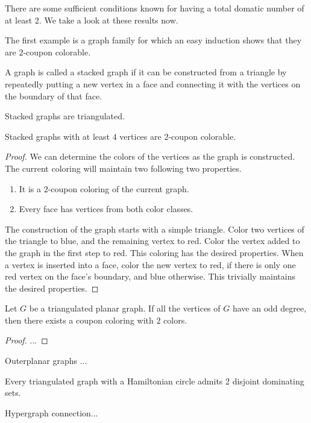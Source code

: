 There are some sufficient conditions known for having a total domatic number of
at least $2$. We take a look at these results now.

The first example is a graph family for which an easy induction shows that they
are $2$-coupon colorable.

\begin{definition}
  A graph is called a stacked graph if it can be constructed from a triangle by
  repeatedly putting a new vertex in a face and connecting it with the vertices on
  the boundary of that face.
\end{definition}
\begin{remark}
  Stacked graphs are triangulated.
\end{remark}
\begin{claim}
  Stacked graphs with at least $4$ vertices are $2$-coupon colorable.
\end{claim}
\begin{proof}
  We can determine the colors of the vertices as the graph is constructed. The
  current coloring will maintain two following two properties.
  \begin{enumerate}
    \item It is a $2$-coupon coloring of the current graph.
    \item Every face has vertices from both color classes.
  \end{enumerate}
  The construction of the graph starts with a simple triangle. Color two vertices
  of the triangle to blue, and the remaining vertex to red. Color the vertex added
  to the graph in the first step to red. This coloring has the desired properties.
  When a vertex is inserted into a face, color the new vertex to red, if there is
  only one red vertex on the face's boundary, and blue otherwise. This trivially
  maintains the desired properties.
\end{proof}

\begin{thm}
  Let $G$ be a triangulated planar graph. If all the vertices of $G$ have an
  odd degree, then there exists a coupon coloring with $2$ colors.
\end{thm}
\begin{proof}
  ...
\end{proof}

\begin{thm}
  Outerplanar graphs ...
\end{thm}

\begin{thm}
  Every triangulated graph with a Hamiltonian circle admits 2 disjoint
  dominating sets.
\end{thm}

Hypergraph connection...
